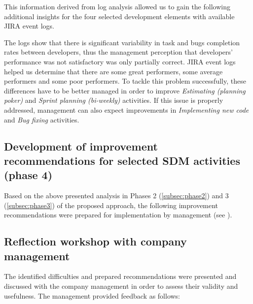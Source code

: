 This information derived from log analysis allowed us to gain the following additional insights for the four selected development elements with available JIRA event logs.

The logs show that there is significant variability in task and bugs completion rates between developers, thus the management perception that developers’ performance was not satisfactory was only partially correct. JIRA event logs helped us determine that there are some great performers, some average performers and some poor performers.  To tackle this problem successfully, these differences have to be better managed in order to improve \emph{Estimating (planning poker)} and \emph{Sprint planning (bi-weekly)} activities. If this issue is properly addressed, management can also expect improvements in \emph{Implementing new code} and \emph{Bug fixing} activities.

\subsection{Development of improvement recommendations for selected SDM activities (phase 4)}

Based on the above presented analysis in Phases 2 (\cref{subsec:phase2}) and 3 (\cref{subsec:phase3}) of the proposed approach, the following improvement recommendations were prepared for implementation by management (see ). 



\subsection{Reflection workshop with company management}

The identified difficulties and prepared recommendations were presented and discussed with the company management in order to assess their validity and usefulness. The management provided feedback as follows:

